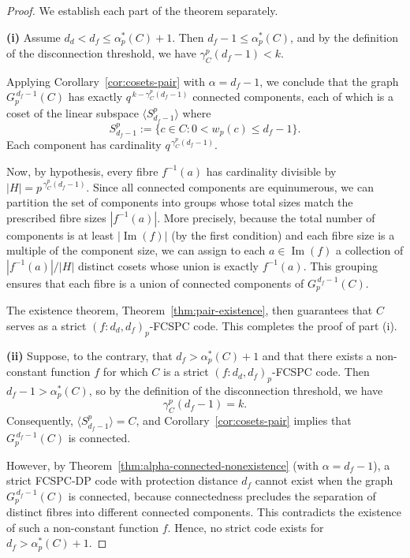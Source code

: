\documentclass[11pt,draftclsnofoot,journal,onecolumn]{IEEEtran}
\begin{document}
    \begin{proof}
    We establish each part of the theorem separately.

    \medskip
    \noindent
    \textbf{(i)} Assume $d_d < d_f \le \alpha_p^*(C) + 1$. Then $d_f - 1 \le \alpha_p^*(C)$, and by the definition of the disconnection threshold, we have $\gamma_C^p(d_f - 1) < k$.

    Applying Corollary~\ref{cor:cosets-pair} with $\alpha = d_f - 1$, we conclude that the graph $G_p^{\,d_f - 1}(C)$ has exactly $q^{\,k - \gamma_C^p(d_f - 1)}$ connected components, each of which is a coset of the linear subspace  $\langle S_{d_f - 1}^p \rangle$
    where
    \[
    S_{d_f - 1}^p := \{ c \in C : 0 < w_p(c) \le d_f - 1 \}.
        \]
    Each component has cardinality $q^{\,\gamma_C^p(d_f - 1)}$.


    Now, by hypothesis, every fibre $f^{-1}(a)$ has cardinality divisible by $|H| = p^{\,\gamma_C^p(d_f - 1)}$. Since all connected components are equinumerous, we can partition the set of components into groups whose total sizes match the prescribed fibre sizes $|f^{-1}(a)|$. More precisely, because the total number of components is at least $|\operatorname{Im}(f)|$ (by the first condition) and each fibre size is a multiple of the component size, we can assign to each $a \in \operatorname{Im}(f)$ a collection of $|f^{-1}(a)| / |H|$ distinct cosets whose union is exactly $f^{-1}(a)$. This grouping ensures that each fibre is a union of connected components of $G_p^{\,d_f - 1}(C)$.

    The existence theorem, Theorem~\ref{thm:pair-existence}, then guarantees that $C$ serves as a strict $(f : d_d, d_f)_p$-FCSPC code. This completes the proof of part (i).

    \medskip
    \noindent
    \textbf{(ii)} Suppose, to the contrary, that $d_f > \alpha_p^*(C) + 1$ and that there exists a non-constant function $f$ for which $C$ is a strict $(f : d_d, d_f)_p$-FCSPC code. Then $d_f - 1 > \alpha_p^*(C)$, so by the definition of the disconnection threshold, we have
    \[
    \gamma_C^p(d_f - 1) = k.
    \]
    Consequently, $\langle S_{d_f - 1}^p \rangle = C$, and Corollary~\ref{cor:cosets-pair} implies that $G_p^{\,d_f - 1}(C)$ is connected.

    However, by Theorem~\ref{thm:alpha-connected-nonexistence} (with $\alpha = d_f - 1$), a strict FCSPC-DP code with protection distance $d_f$ cannot exist when the graph $G_p^{\,d_f - 1}(C)$ is connected, because connectedness precludes the separation of distinct fibres into different connected components. This contradicts the existence of such a non-constant function $f$. Hence, no strict code exists for $d_f > \alpha_p^*(C) + 1$.
    \end{proof}
\end{document}
